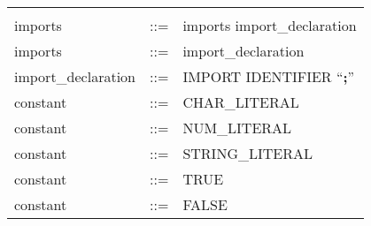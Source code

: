 \begin{longtable}{lrl}
\begin{minipage}[t]{\rulerhs}
  \end{minipage}                                                             \\
imports                                    & ::= &
  \begin{minipage}[t]{\rulerhs}
    \raggedright
    imports import\_declaration
  \end{minipage}                                                             \\
imports                                    & ::= &
  \begin{minipage}[t]{\rulerhs}
    \raggedright
    import\_declaration
  \end{minipage}                                                             \\
import\_declaration                        & ::= &
  \begin{minipage}[t]{\rulerhs}
    \raggedright
    IMPORT IDENTIFIER ``{\bf ;}''
  \end{minipage}                                                             \\
constant                                   & ::= &
  \begin{minipage}[t]{\rulerhs}
    \raggedright
    CHAR\_LITERAL
  \end{minipage}                                                             \\
constant                                   & ::= &
  \begin{minipage}[t]{\rulerhs}
    \raggedright
    NUM\_LITERAL
  \end{minipage}                                                             \\
constant                                   & ::= &
  \begin{minipage}[t]{\rulerhs}
    \raggedright
    STRING\_LITERAL
  \end{minipage}                                                             \\
constant                                   & ::= &
  \begin{minipage}[t]{\rulerhs}
    \raggedright
    TRUE
  \end{minipage}                                                             \\
constant                                   & ::= &
  \begin{minipage}[t]{\rulerhs}
    \raggedright
    FALSE
  \end{minipage}                                                             \\

\end{longtable}
